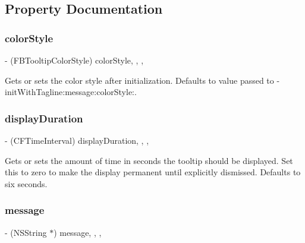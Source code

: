 \subsection{Property Documentation}
\mbox{\label{interfaceFBTooltipView_aa8c3df2b58186ca9c0cc0d4f667c543e}} 
\subsubsection{\texorpdfstring{color\+Style}{colorStyle}}
{\footnotesize\ttfamily -\/ (F\+B\+Tooltip\+Color\+Style) color\+Style\hspace{0.3cm}{\ttfamily [read]}, {\ttfamily [write]}, {\ttfamily [nonatomic]}, {\ttfamily [assign]}}

Gets or sets the color style after initialization.  Defaults to value passed to -\/init\+With\+Tagline\+:message\+:color\+Style\+:. \mbox{\label{interfaceFBTooltipView_a7c907ee0bbcd20cfabd8c2122252c5d6}} 
\subsubsection{\texorpdfstring{display\+Duration}{displayDuration}}
{\footnotesize\ttfamily -\/ (C\+F\+Time\+Interval) display\+Duration\hspace{0.3cm}{\ttfamily [read]}, {\ttfamily [write]}, {\ttfamily [nonatomic]}, {\ttfamily [assign]}}

Gets or sets the amount of time in seconds the tooltip should be displayed.  Set this to zero to make the display permanent until explicitly dismissed. Defaults to six seconds. \mbox{\label{interfaceFBTooltipView_a2ff5931a789e835afc1c1f25fae4626d}} 
\subsubsection{\texorpdfstring{message}{message}}
{\footnotesize\ttfamily -\/ (N\+S\+String $\ast$) message\hspace{0.3cm}{\ttfamily [read]}, {\ttfamily [write]}, {\ttfamily [nonatomic]}, {\ttfamily [copy]}}

